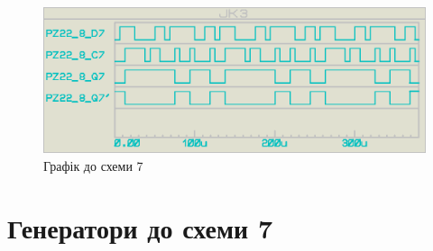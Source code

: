 \documentclass{article}
\begin{document}
\begin{normalsize}
	\begin{figure}[H]
		\centering
		\includegraphics[scale=0.25]{g7}	
		\caption{Графік до схеми 7}
	\end{figure}

	\section*{Генератори до схеми 7}
	\begin{figure}[H]
		\centering
		\hspace{5px}
	\end{figure}


\end{normalsize}
\end{document}
